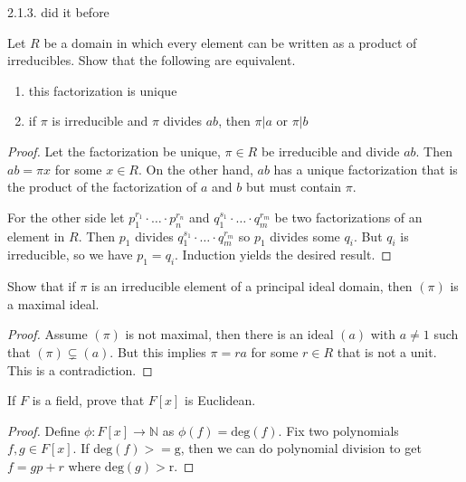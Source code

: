 \begin{example}
    2.1.3. did it before
\end{example}

\begin{example}
    Let \(R\) be a domain in which every element can be written as a product of irreducibles. Show that the following are equivalent.
    \begin{enumerate}
        \item this factorization is unique
        \item if \(\pi\) is irreducible and \(\pi\) divides \(ab\), then \(\pi | a\) or \(\pi | b\)
    \end{enumerate}
\end{example}
\begin{proof}
    Let the factorization be unique, \(\pi \in R\) be irreducible and divide \(ab\). Then \(ab = \pi x\) for some \(x \in R\). On the other hand, \(ab\) has a unique factorization that is the product of the factorization of \(a\) and \(b\) but must contain \(\pi\).

    For the other side let \(p_1^{r_1} \cdot \ldots \cdot p_n^{r_n}\) and \(q_1^{s_1} \cdot \ldots \cdot q_m^{r_m}\) be two factorizations of an element in \(R\). Then \(p_1\) divides \(q_1^{s_1} \cdot \ldots \cdot q_m^{r_m}\) so \(p_1\) divides some \(q_i\). But \(q_i\) is irreducible, so we have \(p_1 = q_i\). Induction yields the desired result.
\end{proof}

\begin{example}
    Show that if \(\pi\) is an irreducible element of a principal ideal domain, then \((\pi)\) is a maximal ideal.
\end{example}
\begin{proof}
    Assume \((\pi)\) is not maximal, then there is an ideal \((a)\) with \(a \neq 1\) such that \((\pi) \subsetneq (a)\). But this implies \(\pi = r a\) for some \(r \in R\) that is not a unit. This is a contradiction.
\end{proof}

\begin{example}
    If \(F\) is a field, prove that \(F[x]\) is Euclidean.
\end{example}
\begin{proof}
    Define \(\phi: F[x] \longrightarrow \mathbb{N}\) as \(\phi(f) = \mathrm{deg}(f)\). Fix two polynomials \(f, g \in F[x]\). If \(\mathrm{deg}(f) >= \mathrm{g}\), then we can do polynomial division to get \(f = g p + r\) where \(\mathrm{deg}(g) > \mathrm{r}\).
\end{proof}

